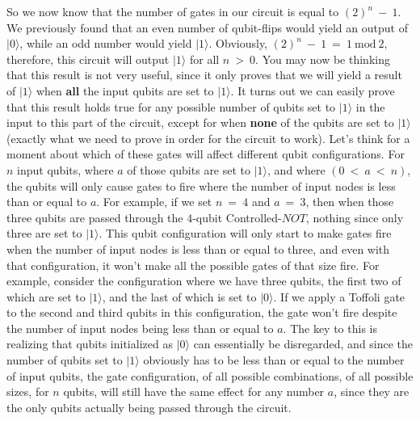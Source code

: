 \documentclass{article}
\begin{document}
\vspace{7}
So we now know that the number of gates in our circuit is equal to $(2)^{n} \ - \ 1$. We previously found that an even number of qubit-flips would yield an output of $|0\rangle$, while an odd number would yield $|1\rangle$. Obviously, $(2)^{n} \ - \ 1 \ = \ 1 \ \text{mod} \ 2$, therefore, this circuit will output $|1\rangle$ for all $n \ > \ 0$.
\newline\newline
You may now be thinking that this result is not very useful, since it only proves that we will yield a result of $|1\rangle$ when \textbf{all} the input qubits are set to $|1\rangle$. It turns out we can easily prove that this result holds true for any possible number of qubits set to $|1\rangle$ in the input to this part of the circuit, except for when \textbf{none} of the qubits are set to $|1\rangle$ (exactly what we need to prove in order for the circuit to work).
\newline\newline
Let’s think for a moment about which of these gates will affect different qubit configurations. For $n$ input qubits, where $a$ of those qubits are set to $|1\rangle$, and where $(0 \ < \ a \ < \ n)$, the qubits will only cause gates to fire where the number of input nodes is less than or equal to $a$. For example, if we set $n \ = \ 4$ and $a \ = \ 3$, then when those three qubits are passed through the $4$-qubit Controlled-$NOT$, nothing since only three are set to $|1\rangle$. This qubit configuration will only start to make gates fire when the number of input nodes is less than or equal to three, and even with that configuration, it won’t make all the possible gates of that size fire. For example, consider the configuration where we have three qubits, the first two of which are set to $|1\rangle$, and the last of which is set to $|0\rangle$. If we apply a Toffoli gate to the second and third qubits in this configuration, the gate won't fire despite the number of input nodes being less than or equal to $a$. The key to this is realizing that qubits initialized as $|0\rangle$ can essentially be disregarded, and since the number of qubits set to $|1\rangle$ obviously has to be less than or equal to the number of input qubits, the gate configuration, of all possible combinations, of all possible sizes, for $n$ qubits, will still have the same effect for any number $a$, since they are the only qubits actually being passed through the circuit.
\newline\newline
\end{document}
